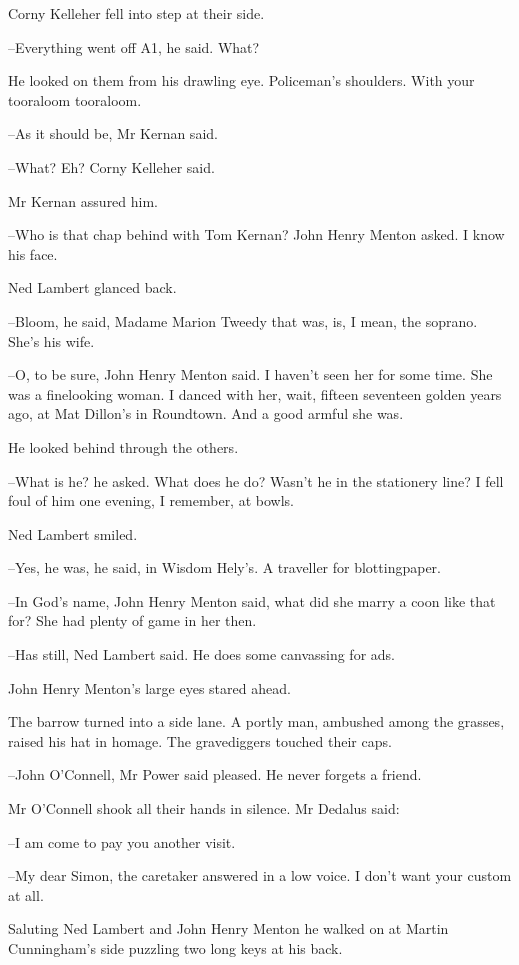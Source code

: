 Corny Kelleher fell into step at their side.

--Everything went off A1,
he said.
What?

He looked on them from his drawling eye.
Policeman's shoulders.
With your tooraloom tooraloom.

--As it should be,
Mr Kernan said.

--What?
Eh?
Corny Kelleher said.

Mr Kernan assured him.

--Who is that chap behind with Tom Kernan?
John Henry Menton asked.
I know his face.

Ned Lambert glanced back.

--Bloom,
he said,
Madame Marion Tweedy that was,
is, I mean,
the soprano.
She's his wife.

--O, to be sure,
John Henry Menton said.
I haven't seen her for some time.
She was a finelooking woman.
I danced with her, wait, fifteen seventeen golden years ago,
at Mat Dillon's in Roundtown.
And a good armful she was.

He looked behind through the others.

--What is he?
he asked.
What does he do?
Wasn't he in the stationery line?
I fell foul of him one evening, I remember, at bowls.

Ned Lambert smiled.

--Yes, he was,
he said,
in Wisdom Hely's.
A traveller for blottingpaper.

--In God's name,
John Henry Menton said,
what did she marry a coon like that for?
She had plenty of game in her then.

--Has still,
Ned Lambert said.
He does some canvassing for ads.

John Henry Menton's large eyes stared ahead.

The barrow turned into a side lane.
A portly man, ambushed among the grasses, raised his hat in homage.
The gravediggers touched their caps.

--John O'Connell,
Mr Power said pleased.
He never forgets a friend.

Mr O'Connell shook all their hands in silence.
Mr Dedalus said:

--I am come to pay you another visit.

--My dear Simon,
the caretaker answered in a low voice.
I don't want your custom at all.

Saluting Ned Lambert and John Henry Menton
he walked on at Martin Cunningham's side
puzzling two long keys at his back.

